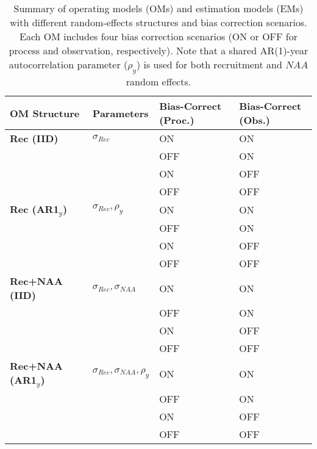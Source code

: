 \begin{table}[H]
\centering
\caption{Summary of operating models (OMs) and estimation models (EMs) with different random-effects structures and bias correction scenarios. Each OM includes four bias correction scenarios (ON or OFF for process and observation, respectively).  Note that a shared AR(1)-year autocorrelation parameter ($\rho_y$) is used for both recruitment and $NAA$ random effects.}
\label{OM_scenario_table}
\begin{scriptsize} %
\begin{tabular}{p{3cm} p{3cm} p{3.5cm} p{3.5cm}} %
\toprule
\textbf{OM Structure} & \textbf{Parameters} & \textbf{Bias-Correct (Proc.)} & \textbf{Bias-Correct (Obs.)} \\
\midrule
\textbf{Rec (IID)} & $\sigma_{Rec}$ & ON & ON \\
                         &                                          & OFF & ON \\
                         &                                          & ON  & OFF \\
                         &                                          & OFF & OFF \\
\midrule
\textbf{Rec (AR1\(_y\))} & $\sigma_{Rec}, \rho_y$ & ON & ON \\
                         &                                          & OFF & ON \\
                         &                                          & ON  & OFF \\
                         &                                          & OFF & OFF \\
\midrule
\textbf{Rec+NAA (IID)} & $\sigma_{Rec}, \sigma_{NAA}$ & ON & ON \\
                         &                                          & OFF & ON \\
                         &                                          & ON  & OFF \\
                         &                                          & OFF & OFF \\
\midrule
\textbf{Rec+NAA (AR1\(_y\))} & $\sigma_{Rec}, \sigma_{NAA}, \rho_y$ & ON & ON \\
                         &                                          & OFF & ON \\
                         &                                          & ON  & OFF \\
                         &                                          & OFF & OFF \\
\bottomrule
\end{tabular}
\end{scriptsize}
\end{table}
